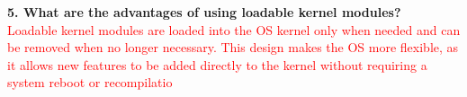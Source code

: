 \documentclass[12pt]{article}
\begin{document}
\noindent \textbf{5. What are the advantages of using loadable kernel modules?} \\ 

\textcolor{red}{Loadable kernel modules are loaded into the OS kernel only when needed and can be removed when no longer necessary. This design makes the OS more flexible, as it allows new features to be added directly to the kernel without requiring a system reboot or recompilatio}


\newpage
\end{document}
